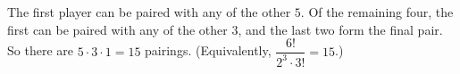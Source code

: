 The first player can be paired with any of the other $5$. Of the remaining four, the first can be paired with any of the other $3$, and the last two form the final pair. So there are $5\cdot3\cdot1=\boxed{15}$ pairings. (Equivalently, $\dfrac{6!}{2^3\cdot3!}=15$.)
